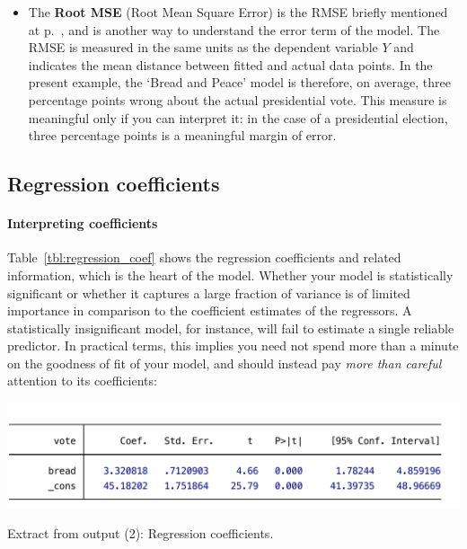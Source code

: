 \begin{itemize}

		\item\label{rmse_explained} The \textbf{Root MSE} (Root Mean Square Error) is the RMSE briefly mentioned at p.~\pageref{rmse}, and is another way to understand the error term of the model. The RMSE is measured in the same units as the dependent variable $Y$ and indicates the mean distance between fitted and actual data points. In the present example, the `Bread and Peace' model is therefore, on average, three percentage points wrong about the actual presidential vote. This measure is meaningful only if you can interpret it: in the case of a presidential election, three percentage points is a meaningful margin of error.

	\end{itemize}

	\subsection{Regression coefficients}
	\paragraph{Interpreting coefficients}%
	\label{sec:coefficients}%
	Table~\ref{tbl:regression_coef} shows the regression coefficients and related information, which is the heart of the model. Whether your model is statistically significant or whether it captures a large fraction of variance is of limited importance in comparison to the coefficient estimates of the regressors. A statistically insignificant model, for instance, will fail to estimate a single reliable predictor. In practical terms, this implies you need not spend more than a minute on the goodness of fit of your model, and should instead pay \emph{more than careful} attention to its coefficients:

	\begin{table}[htp]
		\includegraphics[scale=.5]{images/hibbs_yx1_regress_bottom.pdf}

	  	\caption[Extract from  output (2): Regression coefficients]{\label{tbl:regression_coef}
		Extract from  output (2): Regression coefficients.\\
		\hibbs}
	\end{table}%

